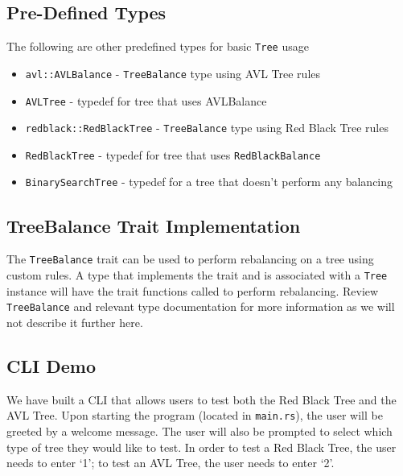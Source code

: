 \documentclass[11pt, letterpaper]{article}
\begin{document}
\subsection{Pre-Defined Types}
The following are other predefined types for basic \texttt{Tree} usage
\begin{itemize}
    \item \texttt{avl::AVLBalance} - \texttt{TreeBalance} type using AVL Tree rules
    \item \texttt{AVLTree} - typedef for tree that uses AVLBalance
    \item \texttt{redblack::RedBlackTree} - \texttt{TreeBalance} type using Red Black Tree rules
    \item \texttt{RedBlackTree} - typedef for tree that uses  \texttt{RedBlackBalance}
    \item \texttt{BinarySearchTree} - typedef for a tree that doesn't perform any balancing
\end{itemize}

\subsection{TreeBalance Trait Implementation}
The \texttt{TreeBalance} trait can be used to perform rebalancing on a tree using custom rules.
A type that implements the trait and is associated with a \texttt{Tree} instance will have the trait functions called
to perform rebalancing.  Review \texttt{TreeBalance} and relevant type documentation for more information as we will not
describe it further here.

\subsection{CLI Demo}
We have built a CLI that allows users to test both the Red Black Tree and the AVL Tree. Upon starting the program (located in \texttt{main.rs}), the user will be greeted by a welcome message. The user will also be prompted to select which type of tree they would like to test. In order to test a Red Black Tree, the user needs to enter `1'; to test an AVL Tree, the user needs to enter `2'. 
\end{document}
